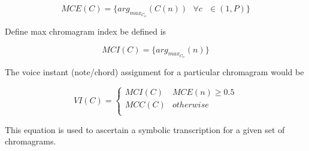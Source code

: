\begin{equation}
MCE(C) = \{arg_{max_{C_n}}(C(n)) \ \ \ \forall c \ \ \ \in (1, P) \}
\end{equation}

\noindent Define max chromagram index be defined is

\begin{equation}
MCI(C) = \{arg_{max_{C_n}}(n)\}
\end{equation}

\noindent The voice instant (note/chord) assignment for a particular chromagram would be 

\begin{equation} \label{eq:VI}
VI(C) = \begin{cases}
      MCI(C) & MCE(n) \geq 0.5 \\
      MCC(C) & otherwise \\  \end{cases}
\end{equation}

\noindent This equation is used to ascertain a symbolic transcription for a given set of chromagrams. 